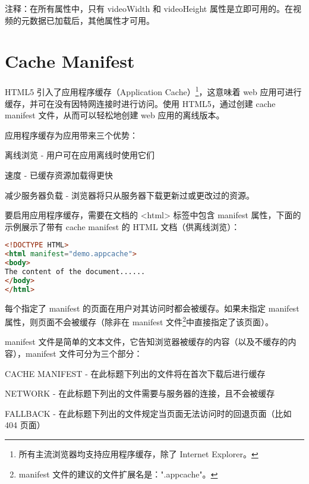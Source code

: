 注释：在所有属性中，只有 videoWidth 和 videoHeight 属性是立即可用的。在视频的元数据已加载后，其他属性才可用。







\section{Cache Manifest}

HTML5 引入了应用程序缓存（Application Cache）\footnote{所有主流浏览器均支持应用程序缓存，除了 Internet Explorer。}，这意味着 web 应用可进行缓存，并可在没有因特网连接时进行访问。使用 HTML5，通过创建 cache manifest 文件，从而可以轻松地创建 web 应用的离线版本。

应用程序缓存为应用带来三个优势：

\begin{compactitem}
\item 离线浏览 - 用户可在应用离线时使用它们
\item 速度 - 已缓存资源加载得更快
\item 减少服务器负载 - 浏览器将只从服务器下载更新过或更改过的资源。
\end{compactitem}

要启用应用程序缓存，需要在文档的 <html> 标签中包含 manifest 属性，下面的示例展示了带有 cache manifest 的 HTML 文档（供离线浏览）：

\begin{lstlisting}[language=HTML]
<!DOCTYPE HTML>
<html manifest="demo.appcache">
<body>
The content of the document......
</body>
</html>
\end{lstlisting}

每个指定了 manifest 的页面在用户对其访问时都会被缓存。如果未指定 manifest 属性，则页面不会被缓存（除非在 manifest 文件\footnote{manifest 文件的建议的文件扩展名是：".appcache"。}中直接指定了该页面）。

manifest 文件是简单的文本文件，它告知浏览器被缓存的内容（以及不缓存的内容），manifest 文件可分为三个部分：

\begin{compactitem}
\item CACHE MANIFEST - 在此标题下列出的文件将在首次下载后进行缓存
\item NETWORK - 在此标题下列出的文件需要与服务器的连接，且不会被缓存
\item FALLBACK - 在此标题下列出的文件规定当页面无法访问时的回退页面（比如 404 页面）
\end{compactitem}



